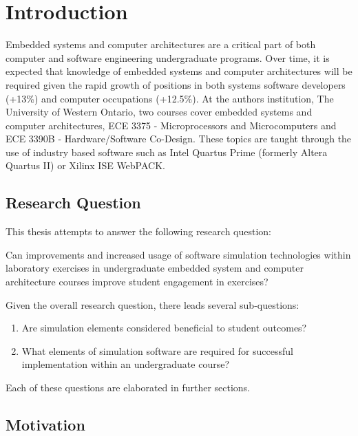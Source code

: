 \chapter{Introduction}


Embedded systems and computer architectures are a critical part of both computer and software engineering undergraduate programs\cite[appendix, p.~73-76]{cec2016}\cite[p.~33]{sec2015}. Over time, it is expected that knowledge of embedded systems and computer architectures will be required given the rapid growth of positions in both systems software developers (+13\%) and computer occupations (+12.5\%)\cite{bls2014}. At the authors institution, The University of Western Ontario, two courses cover embedded systems and computer architectures, ECE 3375 - Microprocessors and Microcomputers and ECE 3390B - Hardware/Software Co-Design\cite{eceOutlines}. These topics are taught through the use of industry based software such as Intel Quartus Prime (formerly Altera Quartus II)\cite{quartus} or Xilinx ISE WebPACK\cite{xilinxISE}.

\section{Research Question}

This thesis attempts to answer the following research question:

\begin{displayquote}
Can improvements and increased usage of software simulation technologies within laboratory exercises in undergraduate embedded system and computer architecture courses improve student engagement in exercises?
\end{displayquote}

Given the overall research question, there leads several sub-questions: 

\begin{enumerate}
	\item Are simulation elements considered beneficial to student outcomes?
	\item What elements of simulation software are required for successful implementation within an undergraduate course?
\end{enumerate}

Each of these questions are elaborated in further sections. 

\section{Motivation}

